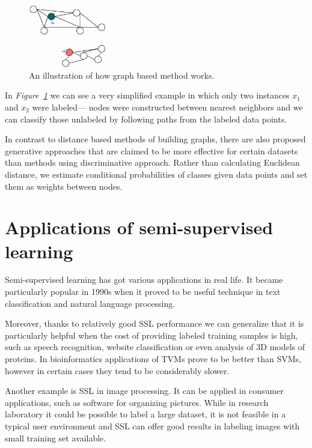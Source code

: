 \documentclass[12pt, a4paper, pdflatex]{report}
\begin{document}
\begin{figure}[htbp]
\centering
\includegraphics[width=0.3\textwidth]{graphics/graph-methods.jpg}
\begin{tiny}
\caption{ An illustration of how graph based method works.\label{fig:GraphMethodFig}}
\end{tiny}
\vspace{1cm}
\end{figure}

In \emph{Figure~\ref{fig:GraphMethodFig}} we can see a very simplified example in which only two instances $x_1$ and $x_2$ were labeled--- nodes were constructed between nearest neighbors and we can classify those unlabeled by following paths from the labeled data points.

In contrast to distance based methods of building graphs, there are also proposed generative approaches that are claimed to be more effective for certain datasets than methods using discriminative approach\cite{He07}. Rather than calculating Euclidean distance, we estimate conditional probabilities of classes given data points and set them as weights between nodes.

\section{Applications of semi-supervised learning}

Semi-supervised learning has got various applications in real life. It became particularly popular in 1990s when it proved to be useful technique in text classification and natural language processing\cite{chapelle06}. 

Moreover, thanks to relatively good SSL performance we can generalize that it is particularly helpful when the cost of providing labeled training samples is high, such as speech recognition, website classification or even analysis of 3D models of proteins. In bioinformatics applications of TVMs prove to be better than SVMs, however in certain cases they tend to be considerably slower\cite{chapelle06}.
 
Another example is SSL in image processing. It can be applied in consumer applications, such as software for organizing pictures. While in research laboratory it could be possible to label a large dataset, it is not feasible in a typical user environment and SSL can offer good results in labeling images with small training set available\cite{Guillaumin10}.
\end{document}
